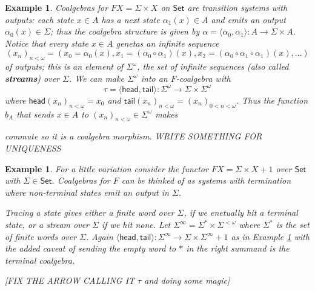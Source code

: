 \documentclass[letterpaper, 11pt, oneside]{memoir}
\theoremstyle{myteo}
\newtheorem{example}[theorem]{Example}
\numberwithin{equation}{section}
\newcommand{\id}{\textsf{id}}
\newcommand{\head}{\textsf{head}}
\newcommand{\tail}{\textsf{tail}}
\newcommand{\Set}{\textsf{Set}}
\newcommand{\intoprod}[2]{{\langle #1, #2\rangle}}
\begin{document}
\begin{example}
  \label{ex:transition_systems_with_outputs}
  Coalgebras for \(FX = \Sigma \times X\) on \(\Set\) are transition systems with outputs: each state \(x \in A\) has a next state \(\alpha_1(x) \in A\) and emits an output \(\alpha_0(x) \in \Sigma\); thus the coalgebra structure is given by \(\alpha = \intoprod{\alpha_0}{\alpha_1} : A \to \Sigma \times A\).
  Notice that every state \(x \in A\) genetas an infinite sequence
  \begin{equation*}
    (x_n)_{n < \omega} = (x_0 = \alpha_0(x), x_1 = (\alpha_0 \circ \alpha_1)(x), x_2 = (\alpha_0 \circ \alpha_1 \circ \alpha_1)(x), \ldots)
  \end{equation*}
  of outputs; this is an element of \(\Sigma^\omega\), the set of infinite sequences (also called \textbf{streams}) over \(\Sigma\).
  We can make \(\Sigma^\omega\) into an \(F\)-coalgebra with
  \begin{equation*}
    \tau = \intoprod{\head}{\tail} : \Sigma^\omega \to \Sigma \times \Sigma^\omega
  \end{equation*}
  where \(\head(x_n)_{n < \omega} = x_0\) and \(\tail(x_n)_{n < \omega} = (x_n)_{0 < n < \omega}\).
  Thus the function \(b_A\) that sends \(x \in A\) to \((x_n)_{n < \omega} \in \Sigma^\omega\) makes
  \begin{center}
  \end{center}
  commute so it is a coalgebra morphism. WRITE SOMETHING FOR UNIQUENESS
\end{example}

\begin{example}
  For a little variation consider the functor \(FX = \Sigma \times X + 1\) over \(\Set\) with \(\Sigma \in \Set\).
  Coalgebras for \(F\) can be thinked of as systems with termination where non-terminal states emit an output in \(\Sigma\).

  Tracing a state gives either a finite word over \(\Sigma\), if we enetually hit a terminal state, or a stream over \(\Sigma\) if we hit none.
  Let \(\Sigma^\infty = \Sigma^* \times \Sigma^{<\omega}\) where \(\Sigma^*\) is the set of finite words over \(\Sigma\).
  Again \(\intoprod{\head}{\tail} : \Sigma^\infty \to \Sigma \times \Sigma^\infty + 1\) as in Example \ref{ex:transition_systems_with_outputs} with the added caveat of sending the empty word to \(*\) in the right summand is the terminal coalgebra.

  [FIX THE ARROW CALLING IT \(\tau\) and doing some magic]
\end{example}
\end{document}
